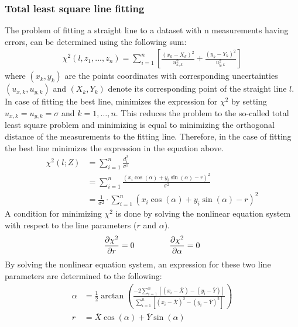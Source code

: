 \documentclass[../Main.tex]{subfiles}
\begin{document}
\subsubsection{Total least square line fitting}
The problem of fitting a straight line to a dataset with n measurements having errors, can be determined using the following sum:
\begin{align}
    \chi^2\left(l, z_1, ..., z_n\right) = \sum_{i = 1}^{n} \left[\frac{\left(x_k - X_k\right)^2}{u_{x, k}^{2}} + \frac{\left(y_k - Y_k\right)^2}{u_{y, k}^{2}}\right]
\end{align}
where $\left(x_k,y_k\right)$ are the points coordinates with corresponding uncertainties $\left(u_{x, k},u_{y, k}\right)$ and $(X_k,Y_k)$ denote its corresponding point of the straight line $l$. In case of fitting the best line, minimizes the expression for $\chi^2$ by setting $u_{x, k} = u_{y, k} = \sigma$ and $k = 1, …, n$. This reduces the problem to the so-called total least square problem and minimizing is equal to minimizing the orthogonal distance of the measurements to the fitting line. Therefore, in the case of fitting the best line minimizes the expression in the equation above.
\begin{align}
    \chi^2\left(l; Z\right) &= \sum_{i = 1}^{n} \frac{d_i^2}{\sigma^2} \\
    &= \sum_{i = 1}^{n}\frac{\left(x_i\cos(\alpha) + y_i\sin⁡(\alpha)-r\right)^2}{\sigma^2}\\
    &= \frac{1}{\sigma^2}\cdot\sum_{i = 1}^{n}\left(x_i\cos(\alpha) + y_i\sin⁡(\alpha)-r\right)^2
\end{align}
A condition for minimizing $\chi^2$ is done by solving the nonlinear equation system with respect to the line parameters ($r$ and $\alpha$). 
\begin{align}
    \frac{\partial\chi^2}{\partial r} = 0 \hspace{1.5cm} \frac{\partial\chi^2}{\partial\alpha} = 0
\end{align}
By solving the nonlinear equation system, an expression for these two line parameters are determined to the following:
\begin{align}
    \alpha &= \frac{1}{2}\arctan\left(\frac{-2\sum_{i=1}^{n}\left[\left(x_i-\overline{X}\right) - \left(y_i-\overline{Y}\right)\right]}{\sum_{i = 1}^{n}\left[\left(x_i-\overline{X}\right)^2 - \left(y_i-\overline{Y}\right)^2\right]}\right) \\
    r &= \overline{X}\cos(\alpha)+\overline{Y}\sin(\alpha)
\end{align}
\end{document}
